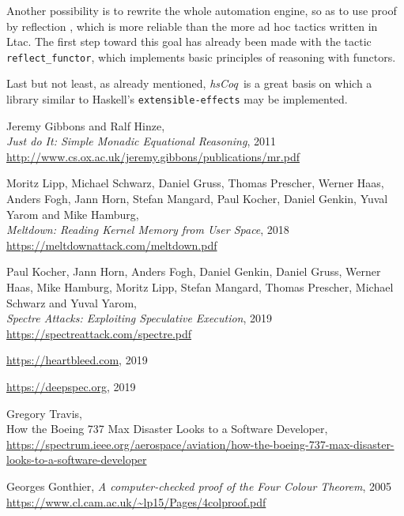 \documentclass[declaration,inz,english,shortabstract]{iithesis}
\newcommand{\libname}{\textit{hsCoq}}
\newcommand{\m}[1]{\texttt{#1}}
\begin{document}
Another possibility is to rewrite the whole automation engine, so as to use proof by reflection \cite{CPDT}, which is more reliable than the more ad hoc tactics written in Ltac. The first step toward this goal has already been made with the tactic \m{reflect\_functor}, which implements basic principles of reasoning with functors.

Last but not least, as already mentioned, \libname\ is a great basis on which a library similar to Haskell's \m{extensible-effects} may be implemented.


\begin{thebibliography}{1}

        Jeremy Gibbons and Ralf Hinze, \\
        \textit{Just do It: Simple Monadic Equational Reasoning}, 2011 \\
        \url{http://www.cs.ox.ac.uk/jeremy.gibbons/publications/mr.pdf}

        Moritz Lipp, Michael Schwarz, Daniel Gruss, Thomas Prescher, Werner Haas, Anders Fogh, Jann Horn, Stefan Mangard, Paul Kocher, Daniel Genkin, Yuval Yarom and Mike Hamburg, \\
        \textit{Meltdown: Reading Kernel Memory from User Space}, 2018 \\
        \url{https://meltdownattack.com/meltdown.pdf}

        Paul Kocher, Jann Horn, Anders Fogh, Daniel Genkin, Daniel Gruss, Werner Haas, Mike Hamburg, Moritz Lipp, Stefan Mangard, Thomas Prescher, Michael Schwarz and Yuval Yarom, \\
        \textit{Spectre Attacks: Exploiting Speculative Execution}, 2019 \\
        \url{https://spectreattack.com/spectre.pdf}
    
        \url{https://heartbleed.com},
        2019

        \url{https://deepspec.org},
        2019

        Gregory Travis, \\
        How the Boeing 737 Max Disaster Looks to a Software Developer, \\
        \url{https://spectrum.ieee.org/aerospace/aviation/how-the-boeing-737-max-disaster-looks-to-a-software-developer}
    
        Georges Gonthier,
        \textit{A computer-checked proof of the Four Colour Theorem}, 2005 \\
        \url{https://www.cl.cam.ac.uk/~lp15/Pages/4colproof.pdf}
    

\end{thebibliography}
\end{document}
